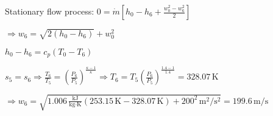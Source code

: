 Stationary flow process:  
\( 0 = \dot{m} \left[ h_0 - h_6 + \frac{w_0^2 - w_6^2}{2} \right] \)  

\( \Rightarrow w_6 = \sqrt{2(h_0 - h_6)} + w_0^2 \)  

\( h_0 - h_6 = c_p (T_0 - T_6) \)  

\( s_5 = s_6 \Rightarrow \frac{T_6}{T_5} = \left( \frac{P_6}{P_5} \right)^{\frac{\kappa - 1}{\kappa}} \Rightarrow T_6 = T_5 \left( \frac{P_6}{P_5} \right)^{\frac{1.4 - 1}{1.4}} = 328.07 \, \text{K} \)  

\( \Rightarrow w_6 = \sqrt{1.006 \, \frac{\text{kJ}}{\text{kg·K}} \left( 253.15 \, \text{K} - 328.07 \, \text{K} \right) + 200^2 \, \text{m}^2/\text{s}^2} = 199.6 \, \text{m/s} \)